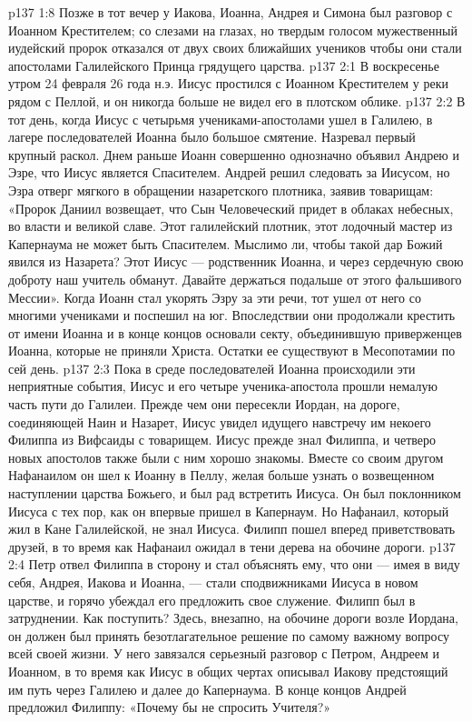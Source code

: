 \vs p137 1:8 \pc Позже в тот вечер у Иакова, Иоанна, Андрея и Симона был разговор с Иоанном Крестителем; со слезами на глазах, но твердым голосом мужественный иудейский пророк отказался от двух своих ближайших учеников чтобы они стали апостолами Галилейского Принца грядущего царства.
\vs p137 2:1 В воскресенье утром 24 февраля 26 года н.э. Иисус простился с Иоанном Крестителем у реки рядом с Пеллой, и он никогда больше не видел его в плотском облике.
\vs p137 2:2 В тот день, когда Иисус с четырьмя учениками\hyp{}апостолами ушел в Галилею, в лагере последователей Иоанна было большое смятение. Назревал первый крупный раскол. Днем раньше Иоанн совершенно однозначно объявил Андрею и Эзре, что Иисус является Спасителем. Андрей решил следовать за Иисусом, но Эзра отверг мягкого в обращении назаретского плотника, заявив товарищам: «Пророк Даниил возвещает, что Сын Человеческий придет в облаках небесных, во власти и великой славе. Этот галилейский плотник, этот лодочный мастер из Капернаума не может быть Спасителем. Мыслимо ли, чтобы такой дар Божий явился из Назарета? Этот Иисус --- родственник Иоанна, и через сердечную свою доброту наш учитель обманут. Давайте держаться подальше от этого фальшивого Мессии». Когда Иоанн стал укорять Эзру за эти речи, тот ушел от него со многими учениками и поспешил на юг. Впоследствии они продолжали крестить от имени Иоанна и в конце концов основали секту, объединившую приверженцев Иоанна, которые не приняли Христа. Остатки ее существуют в Месопотамии по сей день.
\vs p137 2:3 \pc Пока в среде последователей Иоанна происходили эти неприятные события, Иисус и его четыре ученика\hyp{}апостола прошли немалую часть пути до Галилеи. Прежде чем они пересекли Иордан, на дороге, соединяющей Наин и Назарет, Иисус увидел идущего навстречу им некоего Филиппа из Вифсаиды с товарищем. Иисус прежде знал Филиппа, и четверо новых апостолов также были с ним хорошо знакомы. Вместе со своим другом Нафанаилом он шел к Иоанну в Пеллу, желая больше узнать о возвещенном наступлении царства Божьего, и был рад встретить Иисуса. Он был поклонником Иисуса с тех пор, как он впервые пришел в Капернаум. Но Нафанаил, который жил в Кане Галилейской, не знал Иисуса. Филипп пошел вперед приветствовать друзей, в то время как Нафанаил ожидал в тени дерева на обочине дороги.
\vs p137 2:4 Петр отвел Филиппа в сторону и стал объяснять ему, что они --- имея в виду себя, Андрея, Иакова и Иоанна, --- стали сподвижниками Иисуса в новом царстве, и горячо убеждал его предложить свое служение. Филипп был в затруднении. Как поступить? Здесь, внезапно, на обочине дороги возле Иордана, он должен был принять безотлагательное решение по самому важному вопросу всей своей жизни. У него завязался серьезный разговор с Петром, Андреем и Иоанном, в то время как Иисус в общих чертах описывал Иакову предстоящий им путь через Галилею и далее до Капернаума. В конце концов Андрей предложил Филиппу: «Почему бы не спросить Учителя?»
